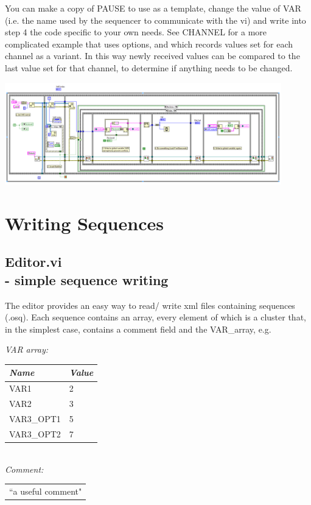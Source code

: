 \documentclass[10pt,a4paper]{article}
\begin{document}
You can make a copy of PAUSE to use as a template, change the value of VAR (i.e. the name used by the sequencer to communicate with the vi) and write into step 4 the code specific to your own needs.  See CHANNEL for a more complicated example that uses options, and which records values set for each channel as a variant.  In this way newly received values can be compared to the last value set for that channel, to determine if anything needs to be changed.

\includegraphics[width=0.9\textwidth]{images/var_block.png}

\section{Writing Sequences}

\subsection[Editor.vi ]{Editor.vi \\ %
	\normalsize - simple sequence writing}
The editor provides an easy way to read/ write xml files containing sequences (.osq).  Each sequence contains an array, every element of which is a cluster that, in the simplest case, contains a comment field and the VAR\_array, e.g.

\hangindent=0.7cm
\emph{VAR array:} \\
\begin{tabularx}{0.4\textwidth}{X|X}
	\emph{Name} & \emph{Value} \\
	\hline
	VAR1 & 2 \\
	VAR2 & 3 \\
	VAR3\_OPT1 & 5 \\
	VAR3\_OPT2 & 7
\end{tabularx}
\vspace{3mm} \\
\emph{Comment:} \\
\begin{tabularx}{0.85\textwidth}{l}
	``a useful comment"
\end{tabularx}
\vspace{3mm}
\end{document}

